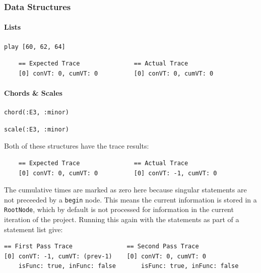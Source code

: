 \documentclass[11pt, abstracton, twoside, titlepage=true]{scrartcl}
\begin{document}
\subsubsection{Data Structures}
\paragraph{Lists}
\begin{minipage}{\textwidth}
	\begin{lstlisting}[style = sonicpi]
      play [60, 62, 64]
	\end{lstlisting}
\end{minipage}

\begin{lstlisting}
    == Expected Trace               == Actual Trace
    [0] conVT: 0, cumVT: 0          [0] conVT: 0, cumVT: 0
\end{lstlisting}

\paragraph{Chords \& Scales}
\begin{minipage}{\textwidth}
	\begin{lstlisting}[style = sonicpi]
      chord(:E3, :minor)
	\end{lstlisting}
\end{minipage}

\begin{minipage}{\textwidth}
	\begin{lstlisting}[style = sonicpi]
      scale(:E3, :minor)
	\end{lstlisting}
\end{minipage}

Both of these structures have the trace results:
\\
\begin{lstlisting}
    == Expected Trace               == Actual Trace
    [0] conVT: 0, cumVT: 0          [0] conVT: -1, cumVT: 0
\end{lstlisting}

The cumulative times are marked as zero here 
because singular statements are not preceeded by a \texttt{begin} node. This means 
the current information is stored in a \texttt{RootNode}, which by default is 
not processed for information in the current iteration of the project. Running this
again with the statements as part of a statement list give:
\\
\begin{lstlisting}
== First Pass Trace               == Second Pass Trace
[0] conVT: -1, cumVT: (prev-1)    [0] conVT: 0, cumVT: 0
    isFunc: true, inFunc: false       isFunc: true, inFunc: false
\end{lstlisting}
\end{document}
